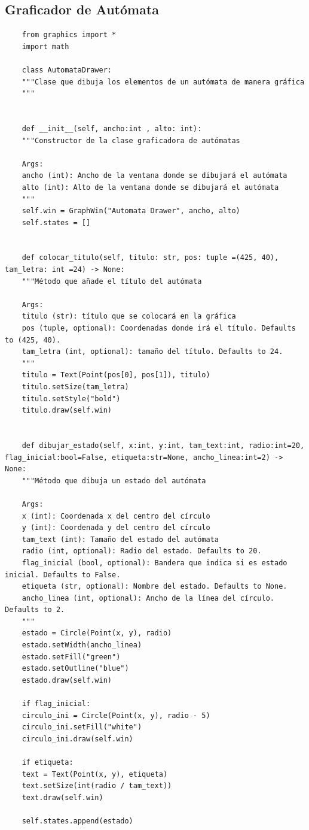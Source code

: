 \documentclass[11pt]{article} %
\begin{document}
	\subsection{Graficador de Autómata}
	\begin{lstlisting}
	from graphics import *
	import math
	
	class AutomataDrawer:
	"""Clase que dibuja los elementos de un autómata de manera gráfica
	"""
	
	
	def __init__(self, ancho:int , alto: int):
	"""Constructor de la clase graficadora de autómatas
	
	Args:
	ancho (int): Ancho de la ventana donde se dibujará el autómata
	alto (int): Alto de la ventana donde se dibujará el autómata
	"""
	self.win = GraphWin("Automata Drawer", ancho, alto)
	self.states = []
	
	
	def colocar_titulo(self, titulo: str, pos: tuple =(425, 40), tam_letra: int =24) -> None:
	"""Método que añade el título del autómata
	
	Args:
	titulo (str): título que se colocará en la gráfica
	pos (tuple, optional): Coordenadas donde irá el título. Defaults to (425, 40).
	tam_letra (int, optional): tamaño del título. Defaults to 24.
	"""
	titulo = Text(Point(pos[0], pos[1]), titulo)
	titulo.setSize(tam_letra)
	titulo.setStyle("bold")
	titulo.draw(self.win)
	
	
	def dibujar_estado(self, x:int, y:int, tam_text:int, radio:int=20, flag_inicial:bool=False, etiqueta:str=None, ancho_linea:int=2) -> None:
	"""Método que dibuja un estado del autómata
	
	Args:
	x (int): Coordenada x del centro del círculo
	y (int): Coordenada y del centro del círculo
	tam_text (int): Tamaño del estado del autómata
	radio (int, optional): Radio del estado. Defaults to 20.
	flag_inicial (bool, optional): Bandera que indica si es estado inicial. Defaults to False.
	etiqueta (str, optional): Nombre del estado. Defaults to None.
	ancho_linea (int, optional): Ancho de la línea del círculo. Defaults to 2.
	"""
	estado = Circle(Point(x, y), radio)
	estado.setWidth(ancho_linea)
	estado.setFill("green")
	estado.setOutline("blue")
	estado.draw(self.win)
	
	if flag_inicial:
	circulo_ini = Circle(Point(x, y), radio - 5)
	circulo_ini.setFill("white")
	circulo_ini.draw(self.win)
	
	if etiqueta:
	text = Text(Point(x, y), etiqueta)
	text.setSize(int(radio / tam_text))
	text.draw(self.win)
	
	self.states.append(estado)
	

\end{lstlisting}
\end{document}
